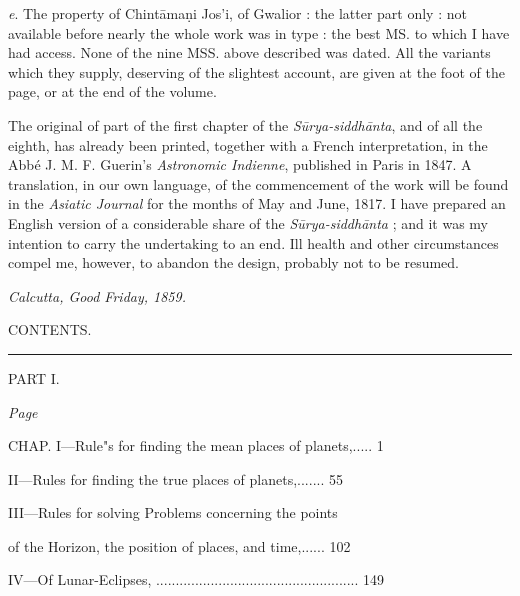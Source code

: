 \documentclass[11pt, openany]{book}
\begin{document}
 {\textenglish{\emph{e}}}. The property of Chintāmaṇi Jos'i, of Gwalior : the latter part only : not available before nearly the whole work was in type : the best MS. to which I have had access. None of the nine MSS. above described was dated. All the variants which they supply, deserving of the slightest account, are given at the foot of the page, or at the end of the volume.

 The original of part of the first chapter of the {\textit{Sūrya-siddhānta}}, and of all the eighth, has already been printed, together with a French interpretation, in the Abbé J. M. F. Guerin's {\textenglish{\emph{Astronomic Indienne}}}, published in Paris in 1847. A translation, in our own language, of the commencement of the work will be found in the {\textenglish{\emph{Asiatic Journal}}} for the months of May and June, 1817.
I have prepared an English version of a considerable share of the {\textenglish{\emph{Sūrya-siddhānta}}} ; and it was my intention to carry the undertaking to an end. Ill health and other circumstances compel me, however, to abandon the design, probably not to be resumed.

\vspace{1cm}

{\textenglish{\emph{Calcutta, Good Friday, 1859.}}}

\newpage


\begin{center}

CONTENTS.

\vspace{3mm}

 \rule{8mm}{.5pt}
\vspace{3mm}
 
 PART I. 
\end{center}

\hfill \textit{Page}

\noindent CHAP. I---Rule"s for finding the mean places of planets,.....  \hfill 1

\hspace{1em} II---Rules for finding the true places of planets,....... \hfill 55 

\hspace{1em} III---Rules for solving Problems concerning the points

\hspace{2em} of the Horizon, the position of places, and time,...... \hfill 102

\hspace{1em} IV---Of Lunar-Eclipses, .................................................... \hfill149
\end{document}
